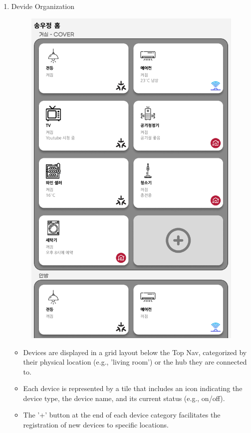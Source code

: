 \documentclass[conference]{IEEEtran}
\begin{document}
\begin{enumerate}[label=\arabic*.]
\begin{enumerate}[label=\alph*.]
\item Devide Organization\\
\begin{figure}[H]\centering \includegraphics[scale=0.35]{images/sw-spec-5.png}\end{figure}
\begin{itemize}
\item Devices are displayed in a grid layout below the Top Nav, categorized by their physical location (e.g., 'living room') or the hub they are connected to.\\
\item Each device is represented by a tile that includes an icon indicating the device type, the device name, and its current status (e.g., on/off).\\
\item The '+' button at the end of each device category facilitates the registration of new devices to specific locations.\\
\end{itemize}


\end{enumerate}
\end{enumerate}
\end{document}

